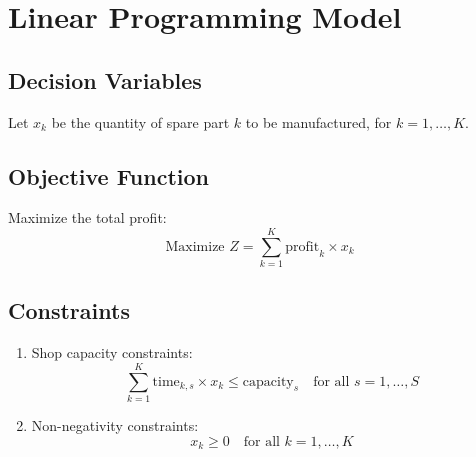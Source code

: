 \documentclass{article}
\begin{document}
\section*{Linear Programming Model}

\subsection*{Decision Variables}
Let \( x_k \) be the quantity of spare part \( k \) to be manufactured, for \( k = 1, \ldots, K \).

\subsection*{Objective Function}
Maximize the total profit:
\[
\text{Maximize } Z = \sum_{k=1}^{K} \text{profit}_{k} \times x_k
\]

\subsection*{Constraints}
\begin{enumerate}
    \item Shop capacity constraints:
    \[
    \sum_{k=1}^{K} \text{time}_{k,s} \times x_k \leq \text{capacity}_{s} \quad \text{for all } s = 1, \ldots, S
    \]
    \item Non-negativity constraints:
    \[
    x_k \geq 0 \quad \text{for all } k = 1, \ldots, K
    \]
\end{enumerate}
\end{document}
